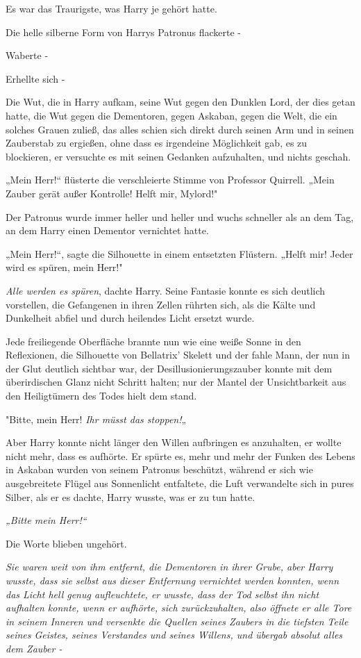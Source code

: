 {Es war das Traurigste, was Harry je gehört hatte.

Die helle silberne Form von Harrys Patronus flackerte -

Waberte -

Erhellte sich -

Die Wut, die in Harry aufkam, seine Wut gegen den Dunklen Lord, der dies getan hatte, die Wut gegen die Dementoren, gegen Askaban, gegen die Welt, die ein solches Grauen zuließ, das alles schien sich direkt durch seinen Arm und in seinen Zauberstab zu ergießen, ohne dass es irgendeine Möglichkeit gab, es zu blockieren, er versuchte es mit seinen Gedanken aufzuhalten, und nichts geschah.

„Mein Herr!“ flüsterte die verschleierte Stimme von Professor Quirrell. „Mein Zauber gerät außer Kontrolle! Helft mir, Mylord!"

Der Patronus wurde immer heller und heller und wuchs schneller als an dem Tag, an dem Harry einen Dementor vernichtet hatte.

„Mein Herr!“, sagte die Silhouette in einem entsetzten Flüstern. „Helft mir! Jeder wird es spüren, mein Herr!"

\emph{Alle werden es spüren}, dachte Harry. Seine Fantasie konnte es sich deutlich vorstellen, die Gefangenen in ihren Zellen rührten sich, als die Kälte und Dunkelheit abfiel und durch heilendes Licht ersetzt wurde.

Jede freiliegende Oberfläche brannte nun wie eine weiße Sonne in den Reflexionen, die Silhouette von Bellatrix' Skelett und der fahle Mann, der nun in der Glut deutlich sichtbar war, der Desillusionierungszauber konnte mit dem überirdischen Glanz nicht Schritt halten; nur der Mantel der Unsichtbarkeit aus den Heiligtümern des Todes hielt dem stand.

"Bitte, mein Herr! \emph{Ihr müsst das stoppen!}„

Aber Harry konnte nicht länger den Willen aufbringen es anzuhalten, er wollte nicht mehr, dass es aufhörte. Er spürte es, mehr und mehr der Funken des Lebens in Askaban wurden von seinem Patronus beschützt, während er sich wie ausgebreitete Flügel aus Sonnenlicht entfaltete, die Luft verwandelte sich in pures Silber, als er es dachte, Harry wusste, was er zu tun hatte.

\emph{\emph{„Bitte mein Herr!“}}

Die Worte blieben ungehört.

\emph{\emph{Sie waren weit von ihm entfernt, die Dementoren in ihrer Grube, aber Harry wusste, dass sie selbst aus dieser Entfernung vernichtet werden konnten, wenn das Licht hell genug aufleuchtete, er wusste, dass der Tod selbst ihn nicht aufhalten konnte, wenn er aufhörte, sich zurückzuhalten, also öffnete er alle Tore in seinem Inneren und versenkte die Quellen seines Zaubers in die tiefsten Teile seines Geistes, seines Verstandes und seines Willens, und übergab absolut alles dem Zauber -}}

}
